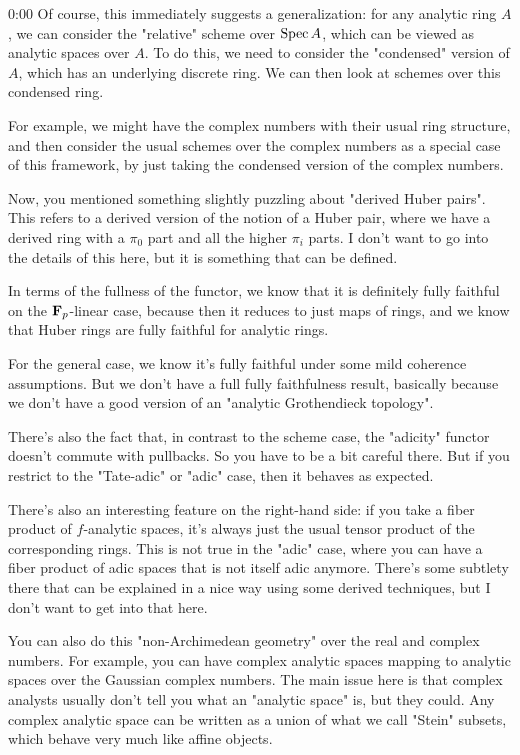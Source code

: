 \begin{unfinished}{0:00}
Of course, this immediately suggests a generalization: for any analytic ring $A$, we can consider the "relative" scheme over $\operatorname{Spec} A$, which can be viewed as analytic spaces over $A$. To do this, we need to consider the "condensed" version of $A$, which has an underlying discrete ring. We can then look at schemes over this condensed ring.

For example, we might have the complex numbers with their usual ring structure, and then consider the usual schemes over the complex numbers as a special case of this framework, by just taking the condensed version of the complex numbers.

Now, you mentioned something slightly puzzling about "derived Huber pairs". This refers to a derived version of the notion of a Huber pair, where we have a derived ring with a $\pi_0$ part and all the higher $\pi_i$ parts. I don't want to go into the details of this here, but it is something that can be defined.

In terms of the fullness of the functor, we know that it is definitely fully faithful on the $\mathbf F_p$-linear case, because then it reduces to just maps of rings, and we know that Huber rings are fully faithful for analytic rings.

For the general case, we know it's fully faithful under some mild coherence assumptions. But we don't have a full fully faithfulness result, basically because we don't have a good version of an "analytic Grothendieck topology".

There's also the fact that, in contrast to the scheme case, the "adicity" functor doesn't commute with pullbacks. So you have to be a bit careful there. But if you restrict to the "Tate-adic" or "adic" case, then it behaves as expected.

There's also an interesting feature on the right-hand side: if you take a fiber product of $f$-analytic spaces, it's always just the usual tensor product of the corresponding rings. This is not true in the "adic" case, where you can have a fiber product of adic spaces that is not itself adic anymore. There's some subtlety there that can be explained in a nice way using some derived techniques, but I don't want to get into that here.

You can also do this "non-Archimedean geometry" over the real and complex numbers. For example, you can have complex analytic spaces mapping to analytic spaces over the Gaussian complex numbers. The main issue here is that complex analysts usually don't tell you what an "analytic space" is, but they could. Any complex analytic space can be written as a union of what we call "Stein" subsets, which behave very much like affine objects.


\end{unfinished}
